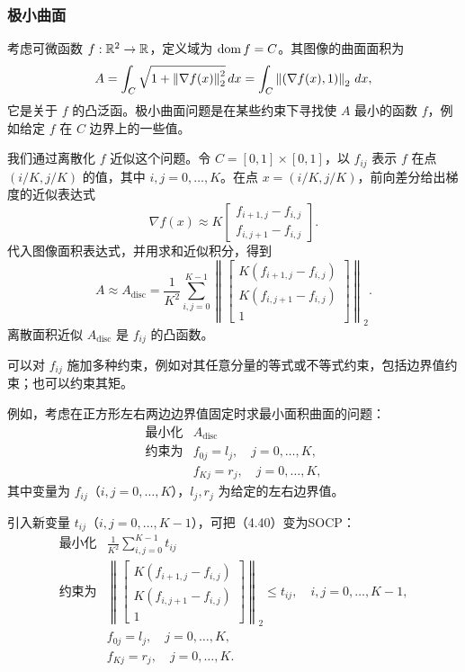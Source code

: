 \subsubsection*{极小曲面}
考虑可微函数 $f:\mathbb R^2\to\mathbb R$，定义域为 $\operatorname{dom} f=C$。其图像的曲面面积为
\[
A=\int_C\sqrt{1+\left\lVert \nabla f(x)\right\rVert_2^2}\,dx
=\int_C\left\lVert (\nabla f(x),1)\right\rVert_2\,dx,
\]
它是关于 $f$ 的凸泛函。极小曲面问题是在某些约束下寻找使 $A$ 最小的函数 $f$，例如给定 $f$ 在 $C$ 边界上的一些值。

我们通过离散化 $f$ 近似这个问题。令 $C=[0,1]\times[0,1]$，以 $f_{ij}$ 表示 $f$ 在点 $(i/K,j/K)$ 的值，其中 $i,j=0,\ldots,K$。在点 $x=(i/K,j/K)$，前向差分给出梯度的近似表达式
\[
\nabla f(x)\approx K\begin{bmatrix}f_{i+1,j}-f_{i,j}\\f_{i,j+1}-f_{i,j}\end{bmatrix}.
\]
代入图像面积表达式，并用求和近似积分，得到
\[
A\approx A_{\mathrm{disc}}=\frac1{K^2}\sum_{i,j=0}^{K-1}
\left\|\begin{bmatrix}K(f_{i+1,j}-f_{i,j})\\K(f_{i,j+1}-f_{i,j})\\1\end{bmatrix}\right\|_2.
\]
离散面积近似 $A_{\mathrm{disc}}$ 是 $f_{ij}$ 的凸函数。

可以对 $f_{ij}$ 施加多种约束，例如对其任意分量的等式或不等式约束，包括边界值约束；也可以约束其矩。

例如，考虑在正方形左右两边边界值固定时求最小面积曲面的问题：
\begin{equation}
\begin{array}{ll}\text{最小化}&A_{\mathrm{disc}}\\\text{约束为}&f_{0j}=l_j,\quad j=0,\ldots,K,\\&f_{Kj}=r_j,\quad j=0,\ldots,K,\end{array}\tag{4.40}
\end{equation}
其中变量为 $f_{ij}$（$i,j=0,\ldots,K$），$l_j,r_j$ 为给定的左右边界值。

引入新变量 $t_{ij}$（$i,j=0,\ldots,K-1$），可把（4.40）变为SOCP：
\[
\begin{array}{ll}
\text{最小化}&\displaystyle\frac1{K^2}\sum_{i,j=0}^{K-1}t_{ij}\\
\text{约束为}&\displaystyle\left\|\begin{bmatrix}K(f_{i+1,j}-f_{i,j})\\K(f_{i,j+1}-f_{i,j})\\1\end{bmatrix}\right\|_2\le t_{ij},\quad i,j=0,\ldots,K-1,\\
&f_{0j}=l_j,\quad j=0,\ldots,K,\\
&f_{Kj}=r_j,\quad j=0,\ldots,K.
\end{array}
\]

